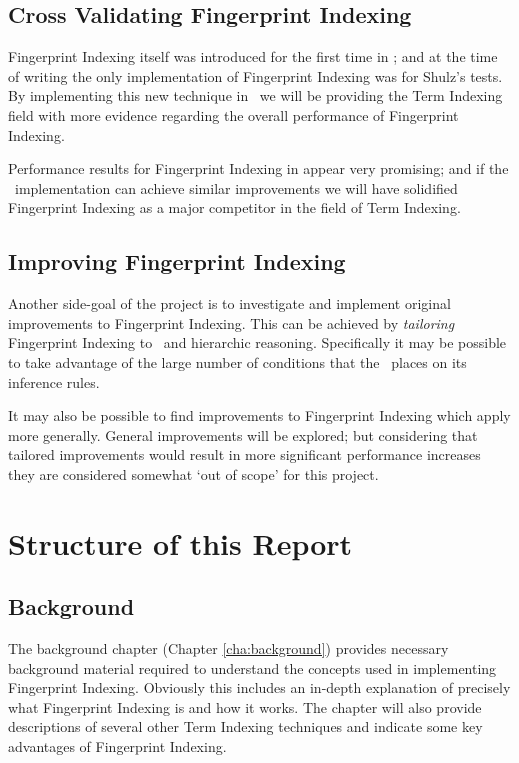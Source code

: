 \subsection{Cross Validating Fingerprint Indexing}

Fingerprint Indexing itself was introduced for the first
time in \cite{shulz12}; and at the time of writing the only
implementation of Fingerprint Indexing was for Shulz's tests. By implementing this new technique in \beagle\ 
we will be providing the Term Indexing field with more evidence regarding the
overall performance of Fingerprint Indexing.

Performance results for Fingerprint Indexing in \cite{shulz12} appear very promising;
and if the \beagle\ implementation can achieve similar improvements we will
have solidified Fingerprint Indexing as a major competitor in the field of Term Indexing.

\subsection{Improving Fingerprint Indexing}

Another side-goal of the project is to investigate and implement original
improvements to Fingerprint Indexing.
This can be achieved by \emph{tailoring} Fingerprint Indexing to \beagle\ 
and hierarchic reasoning. Specifically it may be possible to take
advantage of the large number of conditions that the \HSWAC\ places on
its inference rules.

It may also be possible to find improvements to Fingerprint Indexing which
apply more generally. General improvements will be explored; but considering
that tailored improvements would result in more significant performance increases they
are considered somewhat `out of scope' for this project.

\section{Structure of this Report}
\label{sec:framework}


\subsection{Background}

The background chapter (Chapter \ref{cha:background}) provides necessary background material required to understand
the concepts used in implementing Fingerprint Indexing. Obviously this includes
an in-depth explanation of precisely what Fingerprint Indexing is and how it works.
The chapter will also provide descriptions of several other Term Indexing techniques and
indicate some key advantages of Fingerprint Indexing.

